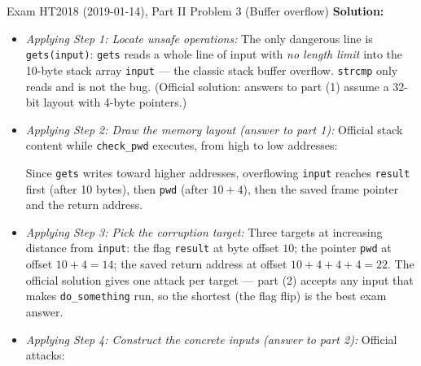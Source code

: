 \documentclass[12pt, a4paper]{article}
\begin{document}
\begin{practicebox}{Exam HT2018 (2019-01-14), Part II Problem 3 (Buffer overflow)}
\textbf{Solution:}
\begin{itemize}
    \item \textit{Applying Step 1: Locate unsafe operations:} The only dangerous line is \texttt{gets(input)}: \texttt{gets} reads a whole line of input with \emph{no length limit} into the 10-byte stack array \texttt{input} --- the classic stack buffer overflow. \texttt{strcmp} only reads and is not the bug. (Official solution: answers to part (1) assume a 32-bit layout with 4-byte pointers.)
    \item \textit{Applying Step 2: Draw the memory layout (answer to part 1):} Official stack content while \texttt{check\_pwd} executes, from high to low addresses:  Since \texttt{gets} writes toward higher addresses, overflowing \texttt{input} reaches \texttt{result} first (after 10 bytes), then \texttt{pwd} (after $10+4$), then the saved frame pointer and the return address.
    \item \textit{Applying Step 3: Pick the corruption target:} Three targets at increasing distance from \texttt{input}: the flag \texttt{result} at byte offset $10$; the pointer \texttt{pwd} at offset $10 + 4 = 14$; the saved return address at offset $10 + 4 + 4 + 4 = 22$. The official solution gives one attack per target --- part (2) accepts any input that makes \texttt{do\_something} run, so the shortest (the flag flip) is the best exam answer.
    \item \textit{Applying Step 4: Construct the concrete inputs (answer to part 2):} Official attacks: 

\end{itemize}
\end{practicebox}
\end{document}
